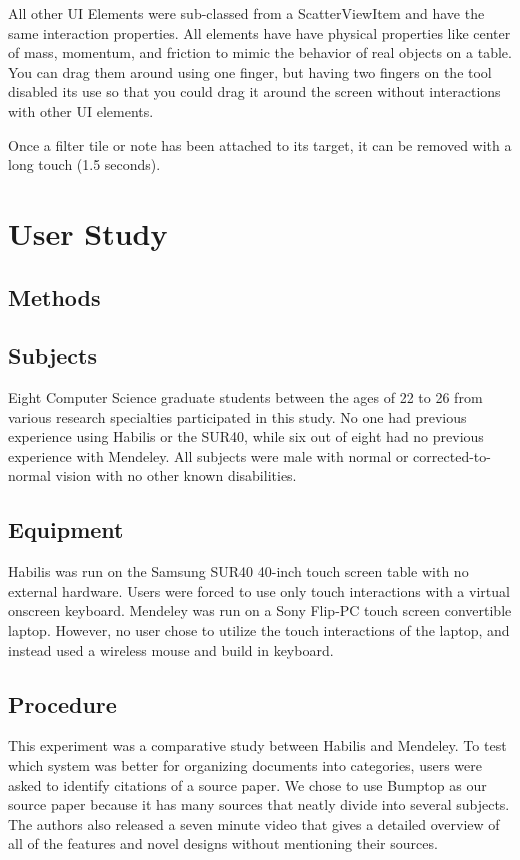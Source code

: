 \documentclass{article}
\begin{document}
All other UI Elements were sub-classed from a ScatterViewItem and have the same interaction properties.  All elements have have physical properties like center of mass, momentum, and friction to mimic the behavior of real objects on a table.  You can drag them around using one finger, but having two fingers on the tool disabled its use so that you could drag it around the screen without interactions with other UI elements.  

Once a filter tile or note has been attached to its target, it can be removed with a long touch (1.5 seconds).  
\section{User Study}
\subsection{Methods}
\subsection*{Subjects}
	Eight Computer Science graduate students between the ages of 22 to 26 from various research specialties participated in this study.  No one had previous experience using Habilis or the SUR40, while six out of eight had no previous experience with Mendeley. All subjects were male with  normal or corrected-to-normal vision with no other known disabilities. 
\subsection*{Equipment}
	Habilis was run on the Samsung SUR40 40-inch touch screen table with no external hardware.  Users were forced to use only touch interactions with a virtual onscreen keyboard. Mendeley was run on a Sony Flip-PC touch screen convertible laptop.  However, no user chose to utilize the touch interactions of the laptop, and instead used a wireless mouse and build in keyboard.  
	
\subsection*{Procedure}

	This experiment was a comparative study between Habilis and Mendeley.  To test which system was better for organizing documents into categories, users were asked to identify citations of a source paper.  We chose to use Bumptop \cite{Agarawala2006}
	as our source paper because it has many sources that neatly divide into several subjects.  The authors also released a seven minute video that gives a detailed overview of all of the features and novel designs without mentioning their sources.   
	
\end{document}
